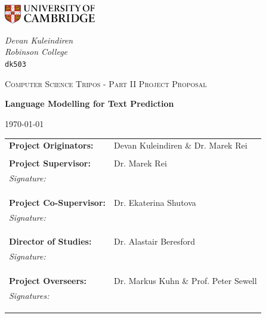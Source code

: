 \documentclass[a4paper, 12pt]{article}
\begin{document}
\begin{titlepage}
	\noindent
	\begin{minipage}[t][][t]{0.5\textwidth}
		\includegraphics[width=40mm]{./Images/CamLogo.jpg}
	\end{minipage}
	\begin{minipage}{0.5\textwidth}
	\begin{flushright}
		\large
		\textit{Devan Kuleindiren}
		\\
		\textit{Robinson College}
		\\
		\texttt{dk503}
	\end{flushright}
	\end{minipage}
	
	\begin{center}
	\vspace{6cm}
	{\scshape\large Computer Science Tripos - Part II Project Proposal\par}
	\vspace{0.5cm}
	{\huge\bfseries Language Modelling for Text Prediction\par}
	\vspace{0.5cm}
	{\large \today \par}
	\end{center}
	
	\vfill
	
	\begin{tabular}{ll}
	\textbf{Project Originators:} & Devan Kuleindiren \& Dr. Marek Rei \\ \\
	\textbf{Project Supervisor:} & Dr. Marek Rei \\
	\textit{Signature:} & \\ \\ \\ \\
	\textbf{Project Co-Supervisor:} & Dr. Ekaterina Shutova \\
	\textit{Signature:} & \\ \\ \\ \\
	\textbf{Director of Studies:} & Dr. Alastair Beresford \\
	\textit{Signature:} & \\ \\ \\ \\
	\textbf{Project Overseers:} & Dr. Markus Kuhn \& Prof. Peter Sewell \\
	\textit{Signatures:} & \\ \\ \\ \\
	\end{tabular}
	
	\vspace{1.5cm}
\end{titlepage}
\end{document}
